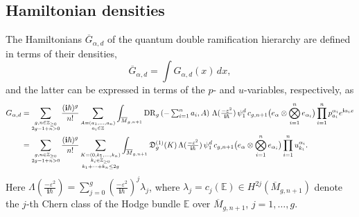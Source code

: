 \documentclass{amsart}
\numberwithin{equation}{section} %
\theoremstyle{plain}
\theoremstyle{remark}
\def\cxi{\mathbf{i}}
\begin{document}
\subsection{Hamiltonian densities}
The Hamiltonians $\overline{G}_{\alpha,d}$ of the quantum double ramification hierarchy are defined in terms of their densities,
\begin{equation*}
\overline{G}_{\alpha,d} = \int G_{\alpha,d}(x) \, dx,
\end{equation*}
and the latter can be expressed in terms of the \(p\)- and $u$-variables, respectively, as
\begin{align*}
G_{\alpha ,d} &= \sum _{\footnotesize\substack{g,n\in \mathbb{Z}_{\geq 0} \\ 2g-1+n>0}} \frac{(\cxi\hbar)^{g}}{n!} \sum_{\footnotesize\substack{A=(a_1,\dots,a_n)\\ a_i \in \mathbb{Z}%
}} \int_{\overline{M}_{g,n+1}} \mathrm{DR}_{g}\left( -\textstyle\sum_{i=1}^n a_{i}, A\right)\, \Lambda( \tfrac{-\varepsilon^2}{\cxi\hbar}) \, \psi_{1}^{d}\, c_{g,n+1}\big(e_{\alpha} \otimes \bigotimes_{i=1}^n e_{\alpha_i} \big)  \prod_{i=1}^n p^{\alpha_i}_{a_i}e^{\cxi a_i x}  \\
&= \sum _{\footnotesize\substack{g,n\in \mathbb{Z}_{\geq 0} \\ 2g-1+n>0}} \frac{(\cxi\hbar)^{g}}{n!} \sum_{\footnotesize\substack{K=(0,k_1,\dots,k_n) \\ k_i \in \mathbb{Z}_{\geq 0} \\ k_1+\cdots+k_n\leq 2g}} 
\int_{\overline{M}_{g,n+1}}\mathfrak{D}^{(1)}_{g}(K) \, \Lambda( \tfrac{-\varepsilon^2}{\cxi\hbar}) \, \psi_{1}^{d}\, c_{g,n+1}\big(e_{\alpha} \otimes \bigotimes_{i=1}^n e_{\alpha_i} \big) \prod_{i=1}^n u^{\alpha_i}_{k_i} .
\end{align*}
Here $ \Lambda(\tfrac{-\varepsilon^2}{\cxi\hbar}) = \sum_{j=0}^g (\tfrac{-\varepsilon^2}{\cxi\hbar})^j \lambda_j$, where $\lambda_j=c_j(\mathbb{E})\in H^{2j}(\overline{M}_{g,n+1})$ denote the $j$-th Chern class of the Hodge bundle $\mathbb{E}$ over $\overline{M}_{g,n+1}$, $j=1,\dots,g$. 
﻿
\par
\end{document}
